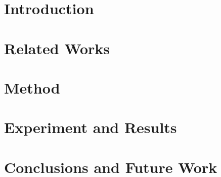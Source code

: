 

\chapter{Introduction} \label{ch:1-introduction}
	

\chapter{Related Works} \label{ch:2-background}
	

\chapter{Method} \label{ch:3-method}
	
	
\chapter{Experiment and Results} \label{ch:4-experiment and results}
	
	
\chapter{Conclusions and Future Work} \label{ch:5-conclusion}
	

